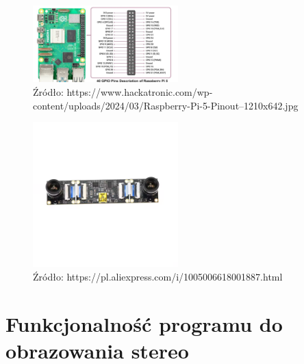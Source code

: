 \documentclass[magisterska]{pracadypl}
\begin{document}
\begin{figure}[h]  %
    \centering  %
    \includegraphics[width=0.5\textwidth]{images/RPI-PIN.jpg}  %
    \captionsetup{labelformat=empty, font=footnotesize}
    \caption{Źródło: https://www.hackatronic.com/wp-content/uploads/2024/03/Raspberry-Pi-5-Pinout--1210x642.jpg}
    \label{fig:rpi-gpio}  %
\end{figure}

\begin{figure}[h]  %
    \centering  %
    \includegraphics[width=0.5\textwidth]{images/MAINSTEREO.png}  %
    \captionsetup{labelformat=empty, font=footnotesize}
    \caption{Źródło: https://pl.aliexpress.com/i/1005006618001887.html}
    \label{fig:mono}  %
\end{figure}

\section{Funkcjonalność programu do obrazowania stereo}
\end{document}
